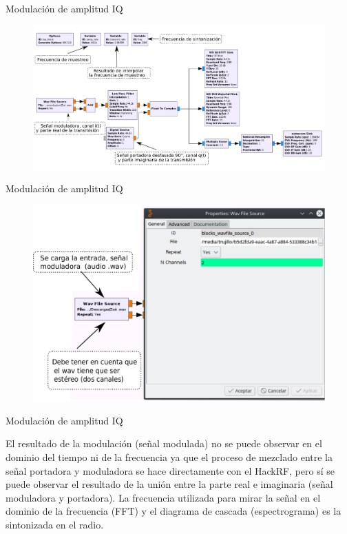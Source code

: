 \begin{frame}{Modulación de amplitud IQ}

\begin{figure}[H]
\centering
\vspace{-3mm}
\includegraphics[width=\textwidth]{parte3/lab15/pdf/lab15_3.pdf}
\end{figure}

\end{frame}

\begin{frame}{Modulación de amplitud IQ}

\begin{figure}[H]
\centering
\vspace{-3mm}
\includegraphics[width=.7\textwidth]{parte3/lab15/pdf/lab15_4.pdf}
\end{figure}

\end{frame}

\begin{frame}{Modulación de amplitud IQ}


El resultado de la modulación (señal modulada) no se puede observar en el dominio del tiempo ni de la frecuencia ya que el proceso de mezclado entre la señal portadora y moduladora se hace directamente con el HackRF, pero sí se puede observar el resultado de la unión entre la parte real e imaginaria (señal moduladora y portadora).  La frecuencia utilizada para mirar la señal en el dominio de la frecuencia (FFT) y el diagrama de cascada (espectrograma) es la sintonizada en el radio.

\end{frame}

